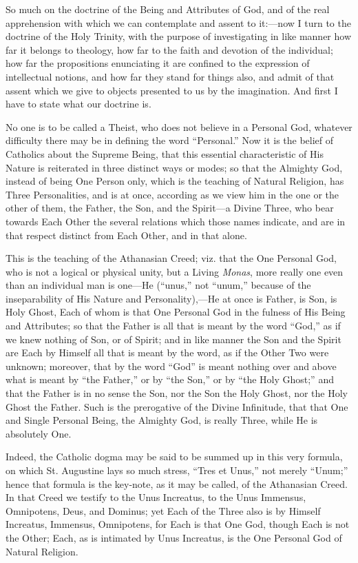 So much on the doctrine of the Being and Attributes of God, and of
the real apprehension with which we can contemplate and assent to it:—now
I turn to the doctrine of the Holy Trinity, with the purpose of
investigating in like manner how far it belongs to theology, how far
to the faith and devotion of the individual; how far the propositions
enunciating it are confined to the expression of intellectual notions,
and how far they stand for things also, and admit of that assent which
we give to objects presented to us by the imagination. And first I
have to state what our doctrine is.

No one is to be called a Theist, who does not believe in a Personal
God, whatever difficulty there may be in defining the word
``Personal.'' Now it is the belief of Catholics about the
Supreme Being, that this essential characteristic of His Nature is
reiterated in three distinct ways or modes; so that the Almighty God,
instead of being One Person only, which is the teaching of Natural
Religion, has Three Personalities, and is at once, according as we
view him in the one or the other of them, the Father, the Son, and the
Spirit—a Divine Three, who bear towards Each Other the several
relations which those names indicate, and are in that respect
distinct from Each Other, and in that alone.

This is the teaching of the Athanasian Creed; viz. that the One
Personal God, who is not a logical or physical unity, but a Living \emph{Monas},
more really one even than an individual man is one—He (``unus,''
not ``unum,'' because of the inseparability of His Nature and
Personality),—He at once is Father, is Son, is Holy Ghost, Each of
whom is that One Personal God in the fulness of His Being and
Attributes; so that the Father is all that is meant by the word
``God,'' as if we knew nothing of Son, or of Spirit; and in
like manner the Son and the Spirit are Each by Himself all that is
meant by the word, as if the Other Two were unknown; moreover, that by
the word ``God'' is meant nothing over and above what is meant
by ``the Father,'' or by ``the Son,'' or by ``the
Holy Ghost;'' and that the Father is in no sense the Son, nor the
Son the Holy Ghost, nor the Holy Ghost the Father. Such is the
prerogative of the Divine Infinitude, that that One and Single
Personal Being, the Almighty God, is really Three, while He is
absolutely One.

Indeed, the Catholic dogma may be said to be summed up in this very
formula, on which St. Augustine lays so much stress, ``Tres et
Unus,'' not merely ``Unum;'' hence that formula is the
key-note, as it may be called, of the Athanasian Creed. In that Creed
we testify to the Unus Increatus, to the Unus Immensus, Omnipotens,
Deus, and Dominus; yet Each of the Three also is by Himself Increatus,
Immensus, Omnipotens, for Each is that One God, though Each is not the
Other; Each, as is intimated by Unus Increatus, is the One
Personal God of Natural Religion.

